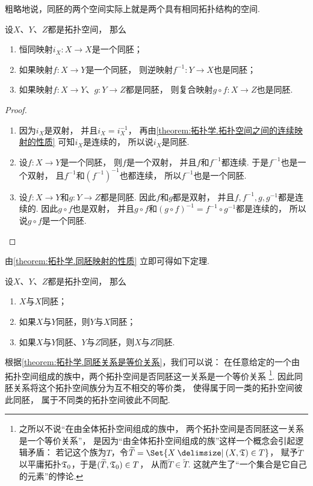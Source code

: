 粗略地说，同胚的两个空间实际上就是两个具有相同拓扑结构的空间.

\begin{theorem}\label{theorem:拓扑学.同胚映射的性质}
设\(X\)、\(Y\)、\(Z\)都是拓扑空间，
那么\begin{enumerate}
	\item 恒同映射\(i_X\colon X \to X\)是一个同胚；
	\item 如果映射\(f\colon X \to Y\)是一个同胚，
	则逆映射\(f^{-1}\colon Y \to X\)也是同胚；
	\item 如果映射\(f\colon X \to Y\)、\(g\colon Y \to Z\)都是同胚，
	则复合映射\(g \circ f\colon X \to Z\)也是同胚.
\end{enumerate}
\begin{proof}
\begin{enumerate}
	\item 因为\(i_X\)是双射，
	并且\(i_X = i_X^{-1}\)，
	再由\cref{theorem:拓扑学.拓扑空间之间的连续映射的性质}
	可知\(i_X\)是连续的，
	所以说\(i_X\)是同胚.

	\item 设\(f\colon X \to Y\)是一个同胚，
	则\(f\)是一个双射，
	并且\(f\)和\(f^{-1}\)都连续.
	于是\(f^{-1}\)也是一个双射，
	且\(f^{-1}\)和\((f^{-1})^{-1}\)也都连续，
	所以\(f^{-1}\)也是一个同胚.

	\item 设\(f\colon X \to Y\)和\(g\colon Y \to Z\)都是同胚.
	因此\(f\)和\(g\)都是双射，
	并且\(f,f^{-1},g,g^{-1}\)都是连续的.
	因此\(g \circ f\)也是双射，
	并且\(g \circ f\)和\((g \circ f)^{-1} = f^{-1} \circ g^{-1}\)都是连续的，
	所以说\(g \circ f\)是一个同胚.
	\qedhere
\end{enumerate}
\end{proof}
\end{theorem}

由\cref{theorem:拓扑学.同胚映射的性质} 立即可得如下定理.
\begin{theorem}\label{theorem:拓扑学.同胚关系是等价关系}
设\(X\)、\(Y\)、\(Z\)都是拓扑空间，
那么\begin{enumerate}
	\item \(X\)与\(X\)同胚；
	\item 如果\(X\)与\(Y\)同胚，则\(Y\)与\(X\)同胚；
	\item 如果\(X\)与\(Y\)同胚、\(Y\)与\(Z\)同胚，则\(X\)与\(Z\)同胚.
\end{enumerate}
\end{theorem}
根据\cref{theorem:拓扑学.同胚关系是等价关系}，我们可以说：
在任意给定的一个由拓扑空间组成的族中，两个拓扑空间是否同胚这一关系是一个等价关系
\footnote{之所以不说“在由全体拓扑空间组成的族中，
两个拓扑空间是否同胚这一关系是一个等价关系”，
是因为“由全体拓扑空间组成的族”这样一个概念会引起逻辑矛盾：
若记这个族为\(T\)，令\(\widetilde{T} = \Set{ X \given (X,\T) \in T }\)，
赋予\(\widetilde{T}\)以平庸拓扑\(\mathfrak T_0\)，于是\((\widetilde{T},\mathfrak T_0) \in T\)，
从而\(\widetilde{T} \in \widetilde{T}\).
这就产生了“一个集合是它自己的元素”的悖论.}.
因此同胚关系将这个拓扑空间族分为互不相交的等价类，
使得属于同一类的拓扑空间彼此同胚，
属于不同类的拓扑空间彼此不同配.

